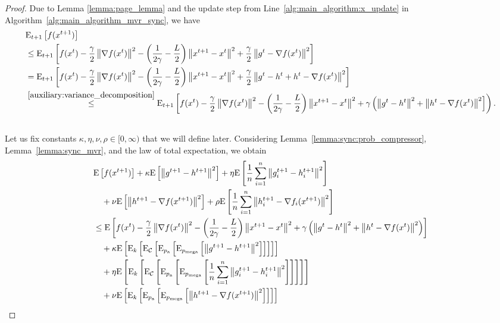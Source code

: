 \documentclass{article}
\newcommand*{\probavailable}{\ensuremath{p_{\textnormal{a}}}}
\newcommand*{\probmega}{\ensuremath{p_{\text{mega}}}}
\begin{document}
\begin{proof}
  Due to Lemma \ref{lemma:page_lemma} and the update step from Line~\ref{alg:main_algorithm:x_update} in Algorithm~\ref{alg:main_algorithm_mvr_sync}, we have
  \begin{align*}
    &{\rm E}_{t+1}\left[f(x^{t + 1})\right] \nonumber\\
    &\leq {\rm E}_{t+1}\left[f(x^t) - \frac{\gamma}{2}\left\| \nabla f(x^t) \right\|^2 - \left(\frac{1}{2\gamma} - \frac{L}{2}\right)
      \left\| x^{t+1} - x^t \right\|^2 + \frac{\gamma}{2}\left\| g^{t} - \nabla f(x^t) \right\|^2\right] \nonumber \\
      &= {\rm E}_{t+1}\left[f(x^t) - \frac{\gamma}{2}\left\| \nabla f(x^t) \right\|^2 - \left(\frac{1}{2\gamma} - \frac{L}{2}\right)
      \left\| x^{t+1} - x^t \right\|^2 + \frac{\gamma}{2}\left\| g^{t} - h^t + h^t - \nabla f(x^t) \right\|^2\right] \nonumber \\
      &\overset{\eqref{auxiliary:variance_decomposition}}{\leq} {\rm E}_{t+1}\left[f(x^t) - \frac{\gamma}{2}\left\| \nabla f(x^t) \right\|^2 - \left(\frac{1}{2\gamma} - \frac{L}{2}\right)
      \left\| x^{t+1} - x^t \right\|^2 + \gamma\left(\left\| g^{t} - h^t \right\|^2 + \left\| h^t - \nabla f(x^t) \right\|^2\right]\right). \nonumber \\
      \nonumber
  \end{align*}
  Let us fix constants $\kappa, \eta, \nu, \rho \in [0,\infty)$ that we will define later. Considering Lemma~\ref{lemma:sync:prob_compressor}, Lemma~\ref{lemma:sync_mvr}, and the law of total expectation, we obtain
  \begin{align*}
    &\Exp{f(x^{t + 1})} + \kappa \Exp{\norm{g^{t+1} - h^{t+1}}^2} + \eta \Exp{\frac{1}{n}\sum_{i=1}^n\norm{g^{t+1}_i - h^{t+1}_i}^2}\\
    &\quad  + \nu \Exp{\norm{h^{t+1} - \nabla f(x^{t+1})}^2} + \rho \Exp{\frac{1}{n}\sum_{i=1}^n\norm{h^{t+1}_i - \nabla f_i(x^{t+1})}^2}\\
    &\leq \Exp{f(x^t) - \frac{\gamma}{2}\norm{\nabla f(x^t)}^2 - \left(\frac{1}{2\gamma} - \frac{L}{2}\right)
    \norm{x^{t+1} - x^t}^2 + \gamma\left(\norm{g^{t} - h^t}^2 + \norm{h^t - \nabla f(x^t)}^2\right)}\nonumber\\
    &\quad + \kappa \Exp{\ExpSub{k}{\ExpSub{\cC}{\ExpSub{\probavailable}{\ExpSub{\probmega}{\norm{g^{t+1} - h^{t+1}}^2}}}}} \\
    &\quad + \eta \Exp{\ExpSub{k}{\ExpSub{\cC}{\ExpSub{\probavailable}{\ExpSub{\probmega}{\frac{1}{n}\sum_{i=1}^n\norm{g^{t+1}_i - h^{t+1}_i}^2}}}}}\\
    &\quad  + \nu \Exp{\ExpSub{k}{\ExpSub{\probavailable}{\ExpSub{\probmega}{\norm{h^{t+1} - \nabla f(x^{t+1})}^2}}}} \\

\end{align*}
\end{proof}
\end{document}
